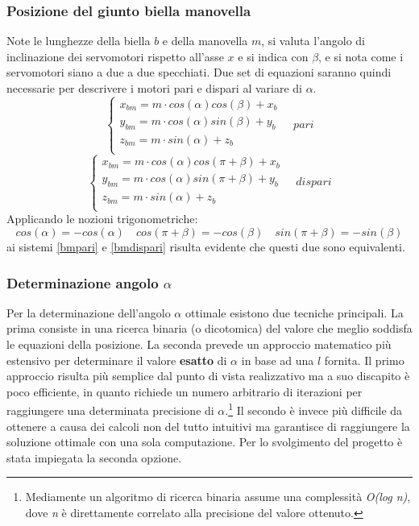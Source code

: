 \documentclass[11pt]{article}
\begin{document}
\subsubsection{Posizione del giunto biella manovella}
Note le lunghezze della biella $b$ e della manovella $m$, si valuta l'angolo di inclinazione dei servomotori rispetto all'asse $x$ e si indica con $\beta$, e si nota come i servomotori siano a due a due specchiati. Due set di equazioni saranno quindi necessarie per descrivere i motori pari e dispari al variare di $\alpha$.
\begin{equation}\label{bmpari}
    \begin{cases}
      x_{bm}=m \cdot cos(\alpha)cos(\beta)+x_b\\
      y_{bm}=m \cdot cos(\alpha)sin(\beta)+y_b\\
      z_{bm}=m \cdot sin(\alpha)+z_b\\
    \end{cases}\quad pari
\end{equation}
\begin{equation}\label{bmdispari}
    \begin{cases}
      x_{bm}=m \cdot cos(\alpha)cos(\pi+\beta)+x_b\\
      y_{bm}=m \cdot cos(\alpha)sin(\pi+\beta)+y_b\\
      z_{bm}=m \cdot sin(\alpha)+z_b\\
    \end{cases}\quad dispari
\end{equation}
Applicando le nozioni trigonometriche: 
$$cos(\alpha)=-cos(\alpha) \quad cos(\pi+\beta)=-cos(\beta) \quad sin(\pi+\beta)=-sin(\beta)$$
ai sistemi \eqref{bmpari} e \eqref{bmdispari} risulta evidente che questi due sono equivalenti.
\subsubsection{Determinazione angolo \boldmath$\alpha$}
Per la determinazione dell'angolo $\alpha$ ottimale esistono due tecniche principali. La prima consiste in una ricerca binaria (o dicotomica) del valore che meglio soddisfa le equazioni della posizione. La seconda prevede un approccio matematico più estensivo per determinare il valore \textbf{esatto} di $\alpha$ in base ad una $l$ fornita. Il primo approccio risulta più semplice dal punto di vista realizzativo ma a suo discapito è poco efficiente, in quanto richiede un numero arbitrario di iterazioni per raggiungere una determinata precisione di $\alpha$.\footnote{Mediamente un algoritmo di ricerca binaria assume una complessità \emph{O(log n)}, dove \emph{n} è direttamente correlato alla precisione del valore ottenuto.} Il secondo è invece più difficile da ottenere a causa dei calcoli non del tutto intuitivi ma garantisce di raggiungere la soluzione ottimale con una sola computazione. Per lo svolgimento del progetto è stata impiegata la seconda opzione.
\end{document}
